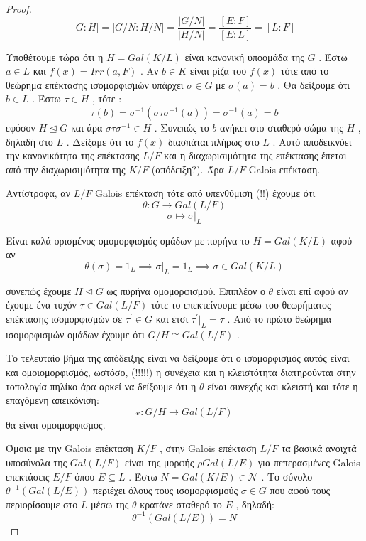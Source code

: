 \documentclass[oneside,a4paper]{article}
\begin{document}
\begin{proof}
$$|G:H| = |G/N : H/N | = \frac{|G/N|}{|H/N|} = \frac{[E:F]}{[E:L]} = [L:F]$$

Υποθέτουμε τώρα ότι η $H = Gal(K/L)$ είναι κανονική υποομάδα της $G$ . Έστω $a \in L$ και $f(x) = Irr(a,F)$ . Αν $b \in K$ είναι ρίζα του $f(x)$ τότε από το θεώρημα επέκτασης ισομορφισμών υπάρχει $\sigma \in G$ με $\sigma (a) = b$ . Θα δείξουμε ότι $b \in L$ . Έστω $\tau \in H$ , τότε :
$$\tau (b) = \sigma^{-1} (\sigma \tau \sigma^{-1} (a)) = \sigma ^{-1} (a) = b$$
εφόσον $H \unlhd G$ και άρα $\sigma \tau \sigma^{-1} \in H$ . Συνεπώς το $b$ ανήκει στο σταθερό σώμα της $H$ , δηλαδή στο $L$ . 
Δείξαμε ότι το $f(x)$ διασπάται πλήρως στο $L$ . Αυτό αποδεικνύει την κανονικότητα της επέκτασης $L/F$ και η διαχωρισιμότητα της επέκτασης έπεται από την διαχωρισιμότητα της $K/F$ (απόδειξη?). Άρα $L/F$ Galois επέκταση.

Αντίστροφα, αν $L/F$ Galois επέκταση τότε από υπενθύμιση (!!) έχουμε ότι
$$\theta: G \longrightarrow Gal(L/F)$$
$$\sigma \longmapsto \sigma|_L$$

Είναι καλά ορισμένος ομομορφισμός ομάδων με πυρήνα το $H = Gal(K/L)$ αφού αν
$$\theta ( \sigma ) = 1_L \implies \sigma |_L = 1_L \implies \sigma \in Gal(K/L)$$

συνεπώς έχουμε $H \unlhd G$ ως πυρήνα ομομορφισμού. Επιπλέον ο $\theta$ είναι επί αφού αν έχουμε ένα τυχόν $\tau \in Gal(L/F)$ τότε το επεκτείνουμε μέσω του θεωρήματος επέκτασης ισομορφισμών σε $\tau^{\prime} \in G$ και έτσι $\tau^{\prime}|_L = \tau$ . Από το πρώτο θεώρημα ισομορφισμών ομάδων έχουμε ότι $G/H \cong Gal(L/F)$ .

Το τελευταίο βήμα της απόδειξης είναι να δείξουμε ότι ο ισομορφισμός αυτός είναι και ομοιομορφισμός, ωστόσο, (!!!!!) η συνέχεια και η κλειστότητα διατηρούνται στην τοπολογία πηλίκο άρα αρκεί να δείξουμε ότι η $\theta$ είναι συνεχής και κλειστή και τότε η επαγόμενη απεικόνιση:
$$\mathcal v :G/H \longrightarrow Gal(L/F)$$
θα είναι ομοιμορφισμός.

Όμοια με την Galois επέκταση $K/F$ , στην Galois επέκταση $L/F$ τα βασικά ανοιχτά υποσύνολα της $Gal(L/F)$ είναι της μορφής $\rho Gal(L/E)$ για πεπερασμένες Galois επεκτάσεις $E/F$ όπου $E\subseteq L$ . Έστω $N =Gal(K/E) \in \mathcal N$ . Το σύνολο $\theta^{-1} (Gal(L/E))$ περιέχει όλους τους ισομορφισμούς $\sigma \in G$ που αφού τους περιορίσουμε στο $L$ μέσω της $\theta$ κρατάνε σταθερό το $E$ , δηλαδή:
$$\theta^{-1} (Gal(L/E)) = N$$


\end{proof}
\end{document}
